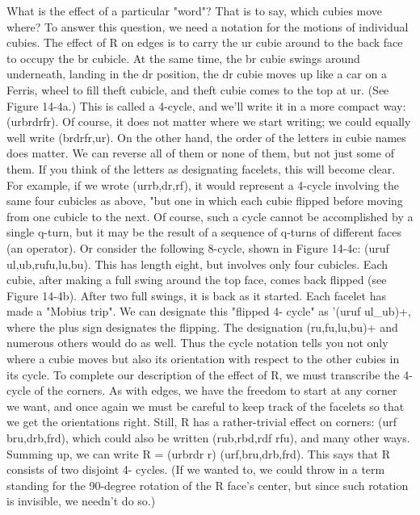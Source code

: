          What is the effect of a particular "word"? That is to say, which cubies move
where? To answer this question, we need a notation for the motions of individual
cubies. The effect of R on edges is to carry the ur cubie around to the back face to
occupy the br cubicle. At the same time, the br cubie swings around underneath,
landing in the dr position, the dr cubie moves up like a car on a Ferris, wheel to fill
theft cubicle, and theft cubie comes to the top at ur. (See Figure 14-4a.) This is called
a 4-cycle, and we'll write it in a more compact way: (urbrdrfr). Of course, it does not
matter where we start writing; we could equally well write (brdrfr,ur).
         On the other hand, the order of the letters in cubie names does matter. We can
reverse all of them or none of them, but not just some of them. If you think of the
letters as designating facelets, this will become clear. For example, if we wrote
(urrb,dr,rf), it would represent a 4-cycle involving the same four cubicles as above,
"but one in which each cubie flipped before moving from one cubicle to the next. Of
course, such a cycle cannot be accomplished by a single q-turn, but it may be the
result of a sequence of q-turns of different faces (an operator). Or consider the
following 8-cycle, shown in Figure 14-4c: (uruf ul,ub,rufu,lu,bu). This has length
eight, but involves only four cubicles. Each cubie, after making a full swing around
the top face, comes back flipped (see Figure 14-4b). After two full swings, it is back
as it started. Each facelet has made a "Mobius trip". We can designate this "flipped 4-
cycle" as '(uruf ul\_ub)+, where the plus sign designates the flipping. The designation
(ru,fu,lu,bu)+ and numerous others would do as well. Thus the cycle notation tells you
not only where a cubie moves but also its orientation with respect to the other cubies
in its cycle.
         To complete our description of the effect of R, we must transcribe the 4-cycle
of the corners. As with edges, we have the freedom to start at any corner we want, and
once again we must be careful to keep track of the facelets so that we get the
orientations right. Still, R has a rather-trivial effect on corners: (urf bru,drb,frd),
which could also be written (rub,rbd,rdf rfu), and many other ways. Summing up, we
can write R = (urbrdr r) (urf,bru,drb,frd). This says that R consists of two disjoint 4-
cycles. (If we wanted to, we could throw in a term standing for the 90-degree rotation
of the R face's center, but since such rotation is invisible, we needn't do so.)




